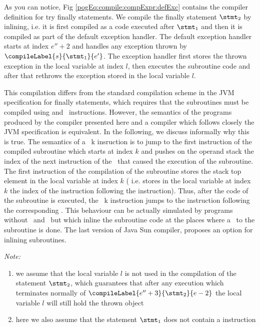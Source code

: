 As you can notice, Fig \ref{pogEq:compile:compExpr:defExc} contains the compiler definition for try finally statements. 
We compile the finally statement $ \stmt_2 $ by inlining, i.e. it is first compiled as a code executed after $\stmt_1$  and
then it is compiled as part of the default exception handler. The default exception handler starts at index $e'' + 2 $ and 
  handles any exception thrown by $\compileLabel{s}{\stmt_1}{e'}$. The exception handler 
first stores the thrown exception in the local variable at index $l$, then executes the subroutine code and after that rethrows the exception 
stored in the local variable $l$. 

This compilation differs from the standard compilation scheme in the JVM specification for finally statements, 
which requires that the subroutines must be compiled using  and 
\ret \ instructions. However, the semantics of the programs produced by the compiler presented here and a compiler which follows closely the JVM specification 
is equivalent. 
In the following, we discuss informally why this is true.
 The semantics of a \jsr \ k insruction is to  jump to the first instruction of the compiled subroutine which starts at index $k$ and pushes on the
 operand stack the index of the next instruction of the \jsr \ that caused the execution of the subroutine. 
The first instruction of the compilation
of the subroutine stores the stack top element in the local variable at index $k$ ( i.e. stores in the local variable at index $k$ the index of the instruction following the  instruction). Thus, after the code of the subroutine is 
executed, the \ret \ k instruction jumps to 
 the instruction following the corresponding \jsr. This behaviour can be actually simulated by programs without \jsr \ and \ret \ but which inline the subroutine code
at the places where a \jsr \ to the subroutine is done.  The last version of Java Sun compiler,
proposes an option for inlining subroutines.

\textit{Note:}
 \begin{enumerate}
           \item we assume that the local variable $l$ is not used in the compilation of the statement $\stmt_2$, which guarantees that after any execution which 
	   terminates normally of $\compileLabel{e'' + 3}{\stmt_2}{e - 2}$ the local variable  $l$ will still hold the thrown object
           \item here we also assume that the statement $\stmt_1$ does not contain a  instruction 
\end{enumerate}

